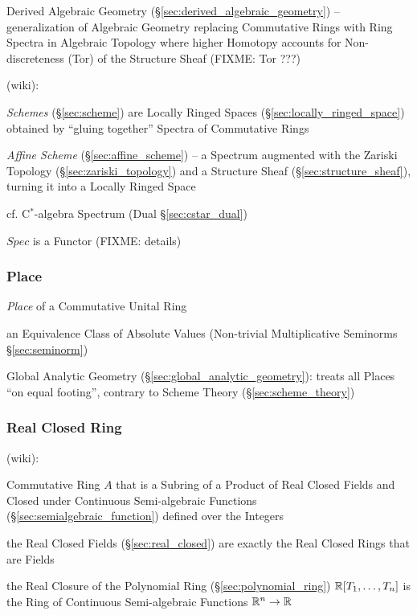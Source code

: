 \fist Derived Algebraic Geometry (\S\ref{sec:derived_algebraic_geometry}) --
generalization of Algebraic Geometry replacing Commutative Rings with Ring
Spectra in Algebraic Topology where higher Homotopy accounts for
Non-discreteness (Tor) of the Structure Sheaf (FIXME: Tor ???)

(wiki):

\fist \emph{Schemes} (\S\ref{sec:scheme}) are Locally Ringed Spaces
(\S\ref{sec:locally_ringed_space}) obtained by ``gluing together'' Spectra of
Commutative Rings

\fist \emph{Affine Scheme} (\S\ref{sec:affine_scheme}) -- a Spectrum augmented
with the Zariski Topology (\S\ref{sec:zariski_topology}) and a Structure Sheaf
(\S\ref{sec:structure_sheaf}), turning it into a Locally Ringed Space

\fist cf. C$^*$-algebra Spectrum (Dual \S\ref{sec:cstar_dual})

$Spec$ is a Functor (FIXME: details)



\subsubsection{Place}\label{sec:place}

\emph{Place} of a Commutative Unital Ring

an Equivalence Class of Absolute Values (Non-trivial Multiplicative Seminorms
\S\ref{sec:seminorm})

\fist Global Analytic Geometry (\S\ref{sec:global_analytic_geometry}): treats
all Places ``on equal footing'', contrary to Scheme Theory
(\S\ref{sec:scheme_theory})



\subsubsection{Real Closed Ring}\label{sec:real_closed_ring}

(wiki):

Commutative Ring $A$ that is a Subring of a Product of Real Closed Fields and
Closed under Continuous Semi-algebraic Functions
(\S\ref{sec:semialgebraic_function}) defined over the Integers

the Real Closed Fields (\S\ref{sec:real_closed}) are exactly the Real Closed
Rings that are Fields

the Real Closure of the Polynomial Ring (\S\ref{sec:polynomial_ring})
$\mathbb{R}[T_1,\ldots,T_n]$ is the Ring of Continuous Semi-algebraic Functions
$\mathbb{R}^n \rightarrow \mathbb{R}$

